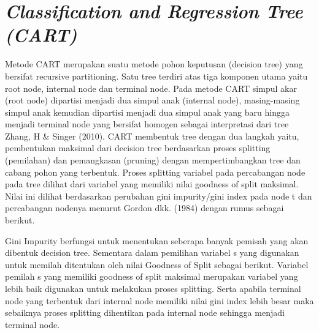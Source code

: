 \section{\textit{Classification and Regression Tree (CART)}}
Metode CART merupakan suatu metode pohon keputusan (decision tree) yang bersifat recursive partitioning. Satu tree terdiri atas tiga komponen utama yaitu root node, internal node dan terminal node. Pada metode CART simpul akar (root node) dipartisi menjadi dua simpul anak (internal node), masing-masing simpul anak kemudian dipartisi menjadi dua simpul anak yang baru hingga menjadi terminal node yang bersifat homogen sebagai interpretasi dari tree Zhang, H \& Singer (2010). CART membentuk tree dengan dua langkah yaitu, pembentukan maksimal dari decision tree berdasarkan proses splitting (pemilahan) dan pemangkasan (pruning) dengan mempertimbangkan tree dan cabang pohon yang terbentuk. Proses splitting variabel pada percabangan node pada tree dilihat dari variabel yang memiliki nilai goodness of split maksimal. Nilai ini dilihat berdasarkan perubahan gini impurity/gini index pada node t dan percabangan nodenya menurut Gordon dkk. (1984) dengan rumus sebagai berikut.

Gini Impurity berfungsi untuk menentukan seberapa banyak pemisah yang akan dibentuk decision tree. Sementara dalam pemilihan variabel s yang digunakan untuk memilah ditentukan oleh nilai Goodness of Split sebagai berikut.
Variabel pemilah s yang memiliki goodness of split maksimal merupakan variabel yang lebih baik digunakan untuk melakukan proses splitting. Serta apabila terminal node yang terbentuk dari internal node memiliki nilai gini index lebih besar maka sebaiknya proses splitting dihentikan pada internal node sehingga menjadi terminal node.

